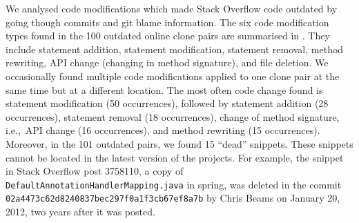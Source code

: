 \documentclass[10pt,journal,compsoc]{IEEEtran}
\begin{document}
We analysed code modifications which made Stack Overflow code outdated by going
though commits and git blame information. The six code modification
types found in the 100 outdated online clone pairs are summarised in
. They include statement addition, statement modification,
statement removal, method rewriting, API change (changing in method signature),
and file deletion. We occasionally found multiple code modifications applied to
one clone pair at the same time but at a different location. The most often code
change found is statement modification (50 occurrences), followed by statement
addition (28 occurrences), statement removal (18 occurrences), change of
method signature, i.e.,~API change (16 occurrences), and method rewriting (15
occurrences). Moreover, in the 101 outdated pairs, we found 15 ``dead''
snippets. These snippets cannot be located in the latest version of the
projects. For example, the snippet in Stack Overflow post 3758110, a copy of
{\small{\texttt{DefaultAnnotationHandlerMapping.java}}} in \textsf{spring}, was
deleted in the commit
{\small{\texttt{02a4473c62d8240837bec297f0a1f3cb67ef8a7b}}} by Chris Beams on
January 20, 2012, two years after it was posted.
\end{document}

